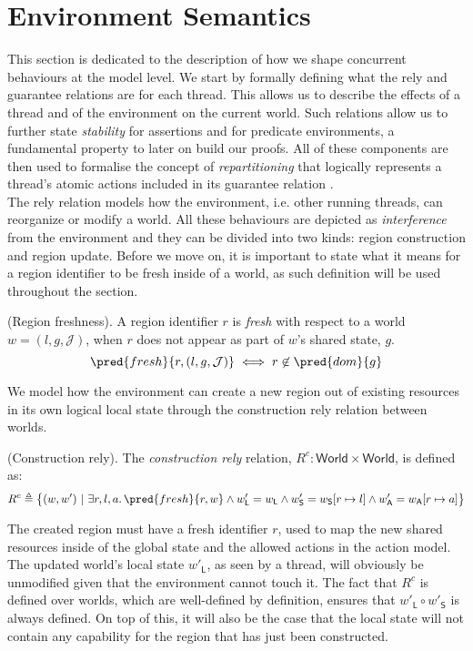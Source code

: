 \section{Environment Semantics}

This section is dedicated to the description of how we shape concurrent behaviours at the model level. We start by formally defining what the rely and guarantee relations are for each thread. This allows us to describe the effects of a thread and of the environment on the current world. Such relations allow us to further state \textit{stability} for assertions and for predicate environments, a fundamental property to later on build our proofs. All of these components are then used to formalise the concept of \textit{repartitioning} that logically represents a thread's atomic actions included in its guarantee relation \cite{cap}\cite{colosl}. \\

The rely relation models how the environment, i.e. other running threads, can reorganize or modify a world. All these behaviours are depicted as \textit{interference} from the environment and they can be divided into two kinds: region construction and region update. Before we move on, it is important to state what it means for a region identifier to be fresh inside of a world, as such definition will be used throughout the section.

\begin{defn}
	(Region freshness).
	A region identifier $r$ is \emph{fresh} with respect to a world $w = (l, g, \mathcal{J})$, when $r$ does not appear as part of $w$'s shared state, $g$.
	\[
		\pred{fresh}{r, (l, g, \mathcal{J})}
			\iff
		r \not\in \pred{dom}{g}
	\]
\end{defn}

We model how the environment can create a new region out of existing resources in its own logical local state through the construction rely relation between worlds.
\begin{defn}
	(Construction rely).
	The \emph{construction rely} relation, $R^c : \mathsf{World} \times \mathsf{World}$, is defined as:
	\[
		R^c \triangleq \big\{ (w, w')\ |\ 
			\exists r, l, a \ldotp \pred{fresh}{r, w} \land w'_\mathsf{L} = w_\mathsf{L} \land w'_\mathsf{S} = w_\mathsf{S}[r \mapsto l] \land w'_\mathsf{A} = w_\mathsf{A}[r \mapsto a]
		\big\}
	\]
\end{defn}
The created region must have a fresh identifier $r$, used to map the new shared resources inside of the global state and the allowed actions in the action model. The updated world's local state $w'_\mathsf{L}$, as seen by a thread, will obviously be unmodified given that the environment cannot touch it. The fact that $R^c$ is defined over worlds, which are well-defined by definition, ensures that $w'_\mathsf{L} \circ w'_\mathsf{S}$ is always defined. On top of this, it will also be the case that the local state will not contain any capability for the region that has just been constructed.

